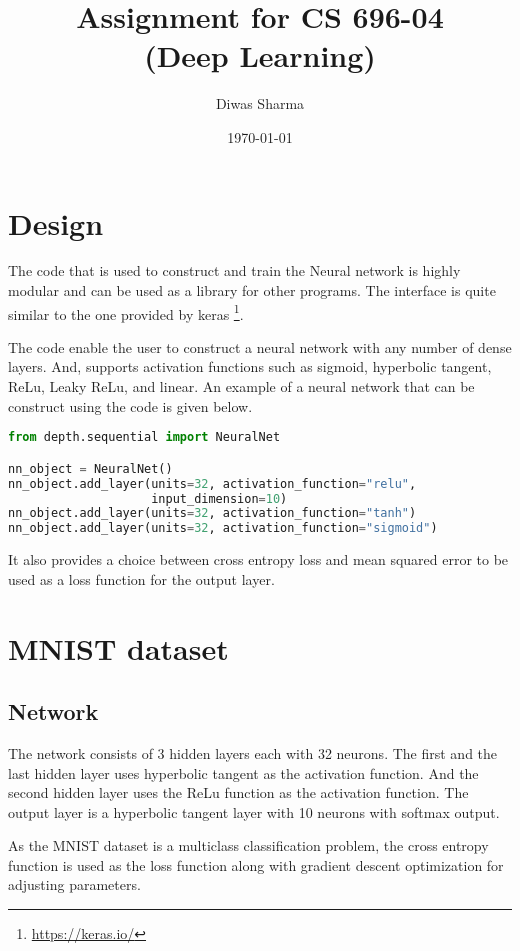 \documentclass{article}
\title{Assignment for CS 696-04 \\ (Deep Learning)}
\author{Diwas Sharma}
\date{\today}
\begin{document}
\maketitle
\newpage

\section{Design}
The code that is used to construct and train the Neural network is highly modular and
can be used as a library for other programs. The interface is quite similar to the one
provided by keras \footnote{\url{https://keras.io/}}.

The code enable the user to construct a neural network with any number of dense
layers. And, supports activation functions such as sigmoid, hyperbolic tangent,
ReLu, Leaky ReLu, and linear. An example of a neural network that can be construct
using the code is given below.

\begin{lstlisting}[language=python]
from depth.sequential import NeuralNet

nn_object = NeuralNet()
nn_object.add_layer(units=32, activation_function="relu",
                    input_dimension=10)
nn_object.add_layer(units=32, activation_function="tanh")
nn_object.add_layer(units=32, activation_function="sigmoid")

\end{lstlisting}

It also provides a choice between cross entropy loss and mean squared
error to be used as a loss function for the output layer.

\section{MNIST dataset}
\subsection{Network}
The network consists of 3 hidden layers each with 32 neurons.  The first and the last
hidden layer uses hyperbolic tangent as the activation function. And the second
hidden layer uses the ReLu function as the activation function. The output layer
is a hyperbolic tangent layer with 10 neurons with softmax output.

As the MNIST dataset is a multiclass classification problem, the cross entropy function
is used as the loss function along with gradient descent optimization for adjusting
parameters.
\end{document}
